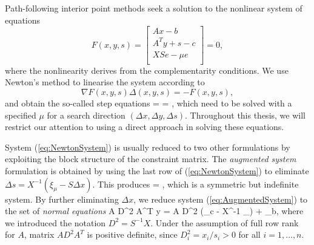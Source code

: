Path-following interior point methods seek a solution 
to the nonlinear system of equations
\[
F(x,y,s) = \left[
  \begin{array}{c}
    Ax-b \\
    A^Ty+s-c \\
    XSe - \mu e \\
  \end{array} \right] = 0,
\]
where the nonlinearity derives from the complementarity conditions.
We use Newton's method to linearise the system according to
\[
\nabla F(x,y,s) \Delta(x,y,s) = -F(x,y,s),
\]
and obtain the so-called step equations
%
\be \label{eq:NewtonSystem}
 =
 =
\left[ \begin{array}{c}
    \xi_b \\ \xi_c \\ \xi_\mu
   \end{array} \right],
\ee
%
which need to be solved with a specified $\mu$ for a search direction
$(\Delta x, \Delta y, \Delta s)$. Throughout this thesis, we will 
restrict our attention to using a direct approach in solving these
equations.

System (\ref{eq:NewtonSystem}) is usually reduced to two other
formulations by exploiting the block structure of the constraint
matrix.
%
The {\em augmented system} formulation is obtained by using 
the last row of (\ref{eq:NewtonSystem}) to eliminate
$\Delta s = X^{-1} (\xi_\mu - S\Delta x)$.
This produces
%
\be \label{eq:AugmentedSystem}
\left[ \begin{array}{cc}
    -X^{-1}S & A^T \\ A & 0
  \end{array} \right]
 =
\left[ \begin{array}{c}
    \xi_c - X^{-1}\xi_\mu \\ \xi_b
   \end{array} \right],
\ee
which is a symmetric but indefinite system.
%
By further eliminating $\Delta x$, we reduce system 
(\ref{eq:AugmentedSystem}) to the set of {\em normal equations}
%
\be \label{eq:NormalEquations}
  A D^2 A^T \Delta y = A D^2 (\xi_c - X^{-1} \xi_\mu) + \xi_b,
\ee
%
where we introduced the notation $D^2 = S^{-1} X$.
Under the assumption of full row rank for $A$, matrix 
$A D^2 A^T$ is positive definite, since $D^2_i = x_i/s_i > 0$ for
all $i = 1, \ldots, n$.

